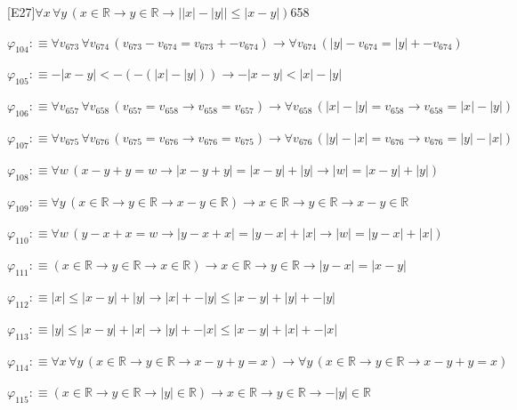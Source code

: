 \begin{fullproof}{[E27]}{$\forall x\,\forall y\,(x \in \mathbb{R} \to y \in \mathbb{R} \to \lvert \lvert x \rvert - \lvert y \rvert \rvert \leq \lvert x - y \rvert)$}{658}
\begin{abbrevlist}
\item $\varphi_{104} :\equiv \forall v_{673}\,\forall v_{674}\,(v_{673} - v_{674} = v_{673} + -v_{674}) \to \forall v_{674}\,(\lvert y \rvert - v_{674} = \lvert y \rvert + -v_{674})$
\item $\varphi_{105} :\equiv -\lvert x - y \rvert < -(-(\lvert x \rvert - \lvert y \rvert)) \to -\lvert x - y \rvert < \lvert x \rvert - \lvert y \rvert$
\item $\varphi_{106} :\equiv \forall v_{657}\,\forall v_{658}\,(v_{657} = v_{658} \to v_{658} = v_{657}) \to \forall v_{658}\,(\lvert x \rvert - \lvert y \rvert = v_{658} \to v_{658} = \lvert x \rvert - \lvert y \rvert)$
\item $\varphi_{107} :\equiv \forall v_{675}\,\forall v_{676}\,(v_{675} = v_{676} \to v_{676} = v_{675}) \to \forall v_{676}\,(\lvert y \rvert - \lvert x \rvert = v_{676} \to v_{676} = \lvert y \rvert - \lvert x \rvert)$
\item $\varphi_{108} :\equiv \forall w\,(x - y + y = w \to \lvert x - y + y \rvert = \lvert x - y \rvert + \lvert y \rvert \to \lvert w \rvert = \lvert x - y \rvert + \lvert y \rvert)$
\item $\varphi_{109} :\equiv \forall y\,(x \in \mathbb{R} \to y \in \mathbb{R} \to x - y \in \mathbb{R}) \to x \in \mathbb{R} \to y \in \mathbb{R} \to x - y \in \mathbb{R}$
\item $\varphi_{110} :\equiv \forall w\,(y - x + x = w \to \lvert y - x + x \rvert = \lvert y - x \rvert + \lvert x \rvert \to \lvert w \rvert = \lvert y - x \rvert + \lvert x \rvert)$
\item $\varphi_{111} :\equiv (x \in \mathbb{R} \to y \in \mathbb{R} \to x \in \mathbb{R}) \to x \in \mathbb{R} \to y \in \mathbb{R} \to \lvert y - x \rvert = \lvert x - y \rvert$
\item $\varphi_{112} :\equiv \lvert x \rvert \leq \lvert x - y \rvert + \lvert y \rvert \to \lvert x \rvert + -\lvert y \rvert \leq \lvert x - y \rvert + \lvert y \rvert + -\lvert y \rvert$
\item $\varphi_{113} :\equiv \lvert y \rvert \leq \lvert x - y \rvert + \lvert x \rvert \to \lvert y \rvert + -\lvert x \rvert \leq \lvert x - y \rvert + \lvert x \rvert + -\lvert x \rvert$
\item $\varphi_{114} :\equiv \forall x\,\forall y\,(x \in \mathbb{R} \to y \in \mathbb{R} \to x - y + y = x) \to \forall y\,(x \in \mathbb{R} \to y \in \mathbb{R} \to x - y + y = x)$
\item $\varphi_{115} :\equiv (x \in \mathbb{R} \to y \in \mathbb{R} \to \lvert y \rvert \in \mathbb{R}) \to x \in \mathbb{R} \to y \in \mathbb{R} \to -\lvert y \rvert \in \mathbb{R}$

\end{abbrevlist}
\end{fullproof}
